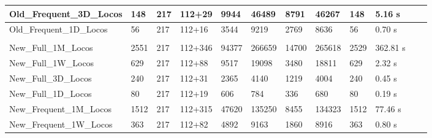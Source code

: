 \begin{landscape}
\begin{table}[h]
\begin{tabular}{@{}llllllllllll@{}}
				Old\_Frequent\_3D\_Locos   & 148                          & 217                          & 112+29                              & \num{9944}        & \num{46489}                  & \num{8791}       & \num{46267}                   & 148                        & 5.16 s                               \\	\hline			
				Old\_Frequent\_1D\_Locos   & 56                          & 217                          & 112+16                              & \num{3544}        & \num{9219}                  & \num{2769}       & \num{8636}                   & 56                        & 0.70 s                               \\	\hline							
				                     \\ \midrule
				New\_Full\_1M\_Locos    			& 2551                          & 217                          & 112+346                              & \num{94377}        & \num{266659}                  & \num{14700}       & \num{265618}                   & 2529                       & 362.81 s                               \\ \hline
				New\_Full\_1W\_Locos    			& 629                          & 217                          & 112+88                              & \num{9517}        & \num{19098}                  & \num{3480}       & \num{18811}                   & 629                       &  2.32 s                             \\ \hline
				New\_Full\_3D\_Locos    			& 240                          & 217                          & 112+31                              & \num{2365}        & \num{4140}                  & \num{1219}       & \num{4004}                   & 240                     & 0.45 s                             \\ \hline
				New\_Full\_1D\_Locos    			& 80                          & 217                          & 112+19                             & \num{606}        & \num{784}                  & \num{336}       & \num{680}                   & 80                     & 0.19 s                              \\ \hline
				New\_Frequent\_1M\_Locos   & 1512                          & 217                          & 112+315                              &  \num{47620}       & \num{135250}                  & \num{8455}       & \num{134323}                  & 1512                       & 77.46 s                            \\	\hline		 
				New\_Frequent\_1W\_Locos   & 363                          & 217                          & 112+82                              & \num{4892}        & \num{9163}                  & \num{1860}       & \num{8916}                   & 363                        & 0.80 s                                \\	\hline			

\end{tabular}
\end{table}
\end{landscape}
